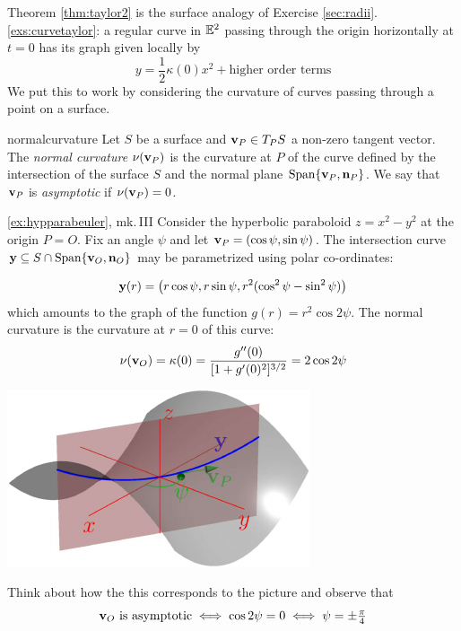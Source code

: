 
Theorem \ref{thm:taylor2} is the surface analogy of Exercise \ref*{sec:radii}.\ref{exs:curvetaylor}: a regular curve in $\mathbb{E}^2$ passing through the origin horizontally at $t=0$ has its graph given locally by
\[
	y=\frac 12\kappa(0)x^2+\text{higher order terms} \tag{$\ast$}
	\]
We put this to work by considering the curvature of curves passing through a point on a surface.

\begin{defn}{}{normalcurvature}
	Let $S$ be a surface and ${\mathbf{v}}_P\in T_PS$ a non-zero tangent vector.\smallbreak
	The \emph{normal curvature} $\nu({\mathbf{v}}_P)$ is the curvature at $P$ of the curve\footnotemark{} defined by the intersection of the surface $S$ and the normal plane $\operatorname{Span}\{{\mathbf{v}}_P,{\mathbf{n}}_P\}$.\smallbreak
	We say that ${\mathbf{v}}_P$ is \emph{asymptotic} if $\nu({\mathbf{v}}_P)=0$.
\end{defn}


\goodbreak


\begin{example*}{\ref{ex:hypparabeuler}, mk.\,III}{}\label{pg:hypparbeuler}
	Consider the hyperbolic paraboloid $z=x^2-y^2$ at the origin $P=O$. Fix an angle $\psi$ and let ${\mathbf{v}}_P=(\cos\psi,\sin\psi)$. The intersection curve ${\mathbf{y}}\subseteq S\cap\operatorname{Span}\{{\mathbf{v}}_O,{\mathbf{n}}_O\}$ may be parametrized using polar co-ordinates:\par
	\begin{minipage}[t]{0.6\linewidth}\vspace{-8pt}
	\[
		{\mathbf{y}}(r)=\bigl(r\cos\psi,r\sin\psi,r^2(\cos^2\psi-\sin^2\psi)\bigr)
	\]
	which amounts to the graph of the function $g(r)=r^2\cos 2\psi$. The normal curvature is the curvature at $r=0$ of this curve:
	\[
		\nu({\mathbf{v}}_O)=\kappa(0)=\frac{g''(0)}{[1+g'(0)^2]^{3/2}} =2\cos 2\psi
	\]
	\end{minipage}
	\hfill
	\begin{minipage}[t]{0.39\linewidth}\vspace{-3pt}
	  \flushright\href{http://www.math.uci.edu/~ndonalds/math162a/euler-setup2.html}{\includegraphics{euler-setup2}}
	\end{minipage}
	\medbreak
	Think about how the this corresponds to the picture and observe that
	\[
		{\mathbf{v}}_O\text{ is asymptotic} \iff \cos 2\psi=0\iff \psi =\pm\tfrac\pi 4
	\]
\end{example*}

